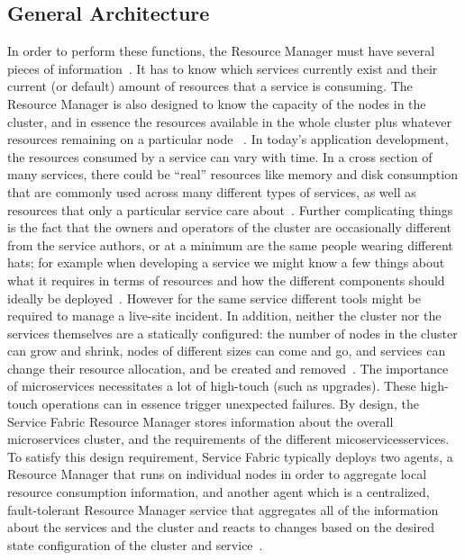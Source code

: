 \subsection{General Architecture}
In order to perform these functions, the Resource Manager must have
several pieces of information~\cite{hid-sp18-501-fig2and3}.  It has to
know which services currently exist and their current (or default)
amount of resources that a service is consuming. The Resource Manager
is also designed to know the capacity of the nodes in the cluster, and
in essence the resources available in the whole cluster plus whatever
resources remaining on a particular node
~\cite{hid-sp18-501-fig2and3}. In today's application development, the
resources consumed by a service can vary with time.  In a cross
section of many services, there could be “real” resources like memory
and disk consumption that are commonly used across many different
types of services, as well as resources that only a particular service
care about~\cite{hid-sp18-501-fig2and3}.  Further complicating things
is the fact that the owners and operators of the cluster are
occasionally different from the service authors, or at a minimum are
the same people wearing different hats; for example when developing a
service we might know a few things about what it requires in terms of
resources and how the different components should ideally be
deployed~\cite{hid-sp18-501-fig2and3}. However for the same service
different tools might be required to manage a live-site incident. In
addition, neither the cluster nor the services themselves are a
statically configured: the number of nodes in the cluster can grow and
shrink, nodes of different sizes can come and go, and services can
change their resource allocation, and be created and
removed~\cite{hid-sp18-501-fig2and3}.  The importance of microservices
necessitates a lot of high-touch (such as upgrades).  These high-touch
operations can in essence trigger unexpected failures. By design, the
Service Fabric Resource Manager stores information about the overall
microservices cluster, and the requirements of the different
micoservicesservices. To satisfy this design requirement, Service
Fabric typically deploys two agents, a Resource Manager that runs on
individual nodes in order to aggregate local resource consumption
information, and another agent which is a centralized, fault-tolerant
Resource Manager service that aggregates all of the information about
the services and the cluster and reacts to changes based on the
desired state configuration of the cluster and
service~\cite{hid-sp18-501-fig2and3}.

